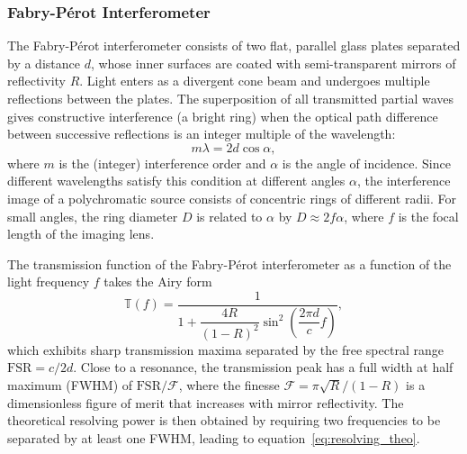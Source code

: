 \documentclass{article}
\begin{document}
\subsubsection{Fabry-Pérot Interferometer}
\label{sec:fabrypérot}

The Fabry-Pérot interferometer consists of two flat, parallel glass plates separated by a distance $d$, whose inner surfaces are coated with semi-transparent mirrors of reflectivity $R$. Light enters as a divergent cone beam and undergoes multiple reflections between the plates. The superposition of all transmitted partial waves gives constructive interference (a bright ring) when the optical path difference between successive reflections is an integer multiple of the wavelength:
\begin{equation}
    m\lambda = 2d\cos\alpha,
    \label{eq:interference_condition}
\end{equation}
where $m$ is the (integer) interference order and $\alpha$ is the angle of incidence. Since different wavelengths satisfy this condition at different angles $\alpha$, the interference image of a polychromatic source consists of concentric rings of different radii. For small angles, the ring diameter $D$ is related to $\alpha$ by $D \approx 2f\alpha$, where $f$ is the focal length of the imaging lens.

The transmission function of the Fabry-Pérot interferometer as a function of the light frequency $f$ takes the Airy form
\begin{equation}
    \mathbb{T}(f) = \frac{1}{1 + \dfrac{4R}{(1-R)^2}\sin^2\!\left(\dfrac{2\pi d}{c}f\right)},
\end{equation}
which exhibits sharp transmission maxima separated by the free spectral range $\mathrm{FSR} = c/2d$. Close to a resonance, the transmission peak has a full width at half maximum (FWHM) of $\mathrm{FSR}/\mathcal{F}$, where the finesse $\mathcal{F} = \pi\sqrt{R}/(1-R)$ is a dimensionless figure of merit that increases with mirror reflectivity. The theoretical resolving power is then obtained by requiring two frequencies to be separated by at least one FWHM, leading to equation~\eqref{eq:resolving_theo}.
\end{document}
